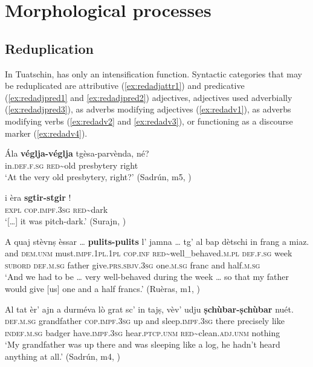 \chapter{Morphological processes}

\section{Reduplication}\label{sec:7.1}
In Tuatschin,  has only an intensification function. Syntactic categories that may be reduplicated are attributive (\ref{ex:redadjattr1}) and predicative (\ref{ex:redadjpred1} and \ref{ex:redadjpred2})  adjectives, adjectives used adverbially (\ref{ex:redadjpred3}), as adverbs modifying adjectives (\ref{ex:redadv1}), as adverbs modifying verbs (\ref{ex:redadv2} and \ref{ex:redadv3}), or functioning as a discourse marker (\ref{ex:redadv4}).

\ea\label{ex:redadjattr1}
\gll  Ála \textbf{véglja-véglja} tgèsa-parvènda, né?\\
in.\textsc{def.f.sg} \textsc{red}\textasciitilde{old} presbytery right\\
\glt `At the very old presbytery, right?' (Sadrún, m5, )
\z

\ea
\label{ex:redadjpred1}
\gll  […] i èra \textbf{sgtir-stgir} !\\
{}  \textsc{expl} \textsc{cop.impf.3sg} \textsc{red}\textasciitilde{dark}\\
\glt `[…] it was pitch-dark.' (Surajn, \citealt[128]{Büchli1966})
\z

\ea
\label{ex:redadjpred2}
\gll    A quaj stèvnṣ èssar … \textbf{pulits-pulits} l’ jamna … tg’ al bap dètschi in frang a miaz.\\
and \textsc{dem.unm} must.\textsc{impf.1pl.1pl} \textsc{cop.inf} {} \textsc{red}\textasciitilde{well\_behaved}.\textsc{m.pl} \textsc{def.f.sg} week {} \textsc{subord} \textsc{def.m.sg} father  give.\textsc{prs.sbjv.3sg} one.\textsc{m.sg} franc and half.\textsc{m.sg}\\
\glt `And we had to be … very well-behaved during the week … so that my father would give [us] one and a half francs.' (Ruèras, m1, )
\z

\ea
\label{ex:redadjpred3}
\gll  Al tat èr’ ajn a durméva lò grat sc’ in tajṣ, vèv’ udju \textbf{ṣchùbar-ṣchùbar} nuét.  \\
\textsc{def.m.sg} grandfather \textsc{cop.impf.3sg} up and sleep.\textsc{impf.3sg} there precisely like \textsc{indef.m.sg} badger have.\textsc{impf.3sg} hear.\textsc{ptcp.unm} \textsc{red}\textasciitilde{clean}.\textsc{adj.unm} nothing\\
\glt `My grandfather was up there and was sleeping like a log, he hadn’t heard anything at all.' (Sadrún, m4, )
\z


